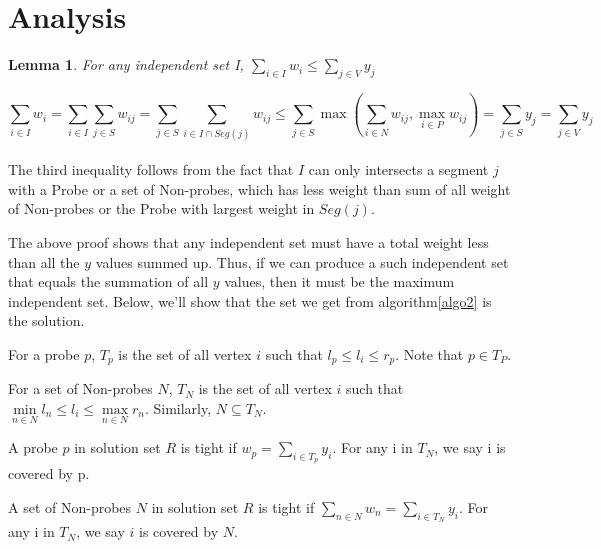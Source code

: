 \documentclass[preprint,12pt,authoryear]{elsarticle}
\newtheorem{lemma}[theorem]{Lemma}
\newenvironment{proof}[1][Proof]{\begin{trivlist}
\item[\hskip \labelsep {\bfseries #1}]}{\end{trivlist}}
\newenvironment{definition}[1][Definition]{\begin{trivlist}
\item[\hskip \labelsep {\bfseries #1}]}{\end{trivlist}}
\begin{document}
\section{Analysis}

	\begin{lemma}
    \label{upper_bound}
    For any independent set I, $\sum\limits_{i\in I}w_i \leq \sum\limits_{j \in V} y_{j}$
  \end{lemma}

  \begin{proof}
    \label{upper_bound_proof}
    $$\sum\limits_{i\in I}w_i = \sum\limits_{i\in I}\sum\limits_{j \in S}w_{ij} = \sum\limits_{j \in S}\sum\limits_{i\in I\cap Seg(j)}w_{ij} \leq \sum\limits_{j \in S}\max(\sum\limits_{i\in N}w_{ij},\max\limits_{i\in P}w_{ij}) = \sum\limits_{j \in S}y_{j} = \sum\limits_{j \in V}y_{j} $$\\
    The third inequality follows from the fact that $I$ can only intersects a segment $j$ with a Probe or a set of Non-probes, which has less weight than sum of all weight of Non-probes or the Probe with largest weight in $Seg(j)$.
  \end{proof}
  The above proof shows that any independent set must have a total weight less than all the $y$ values summed up. Thus, if we can produce a such independent set that equals the summation of all $y$ values, then it must be the maximum independent set. Below, we'll show that the set we get from algorithm\ref{algo2} is the solution.

\begin{definition}
\label{TP}
For a probe $p$, $T_{p}$ is the set of all vertex $i$ such that $l_{p} \leq l_{i} \leq r_{p}$. Note that $p \in T_{P}$.
\end{definition}
\begin{definition}
\label{TN}
For a set of Non-probes $N$, $T_{N}$ is the set of all vertex $i$ such that $\min\limits_{n \in N}l_{n} \leq l_{i} \leq \max\limits_{n\in N}r_{n}$. Similarly, $N \subseteq T_{N}$.
\end{definition}

\begin{definition}
\label{tightp}
A probe $p$ in solution set $R$ is tight if $w_{p} = \sum\limits_{i \in T_{p}} y_{i}$. For any i in $T_{N}$, we say i is covered by p.
\end{definition}

\begin{definition}
\label{tightn}
A set of Non-probes $N$ in solution set $R$ is tight if $\sum\limits_{n \in N}w_{n} = \sum\limits_{i \in T_{N}}y_{i}$. For any i in $T_{N}$, we say $i$ is covered by $N$.
\end{definition}
\end{document}
